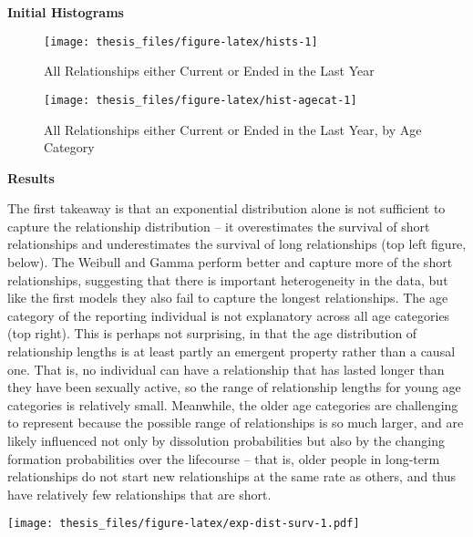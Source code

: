 \documentclass [11pt, proquest] {uwthesis}[2015/03/03]
\begin{document}
\textbf{Initial Histograms}
\begin{figure}

{\centering \texttt{[image: thesis\_files/figure-latex/hists-1]} 

}

\caption{All Relationships either Current or Ended in the Last Year}\label{fig:hists}
\end{figure}
\begin{figure}

{\centering \texttt{[image: thesis\_files/figure-latex/hist-agecat-1]} 

}

\caption{All Relationships either Current or Ended in the Last Year, by Age Category}\label{fig:hist-agecat}
\end{figure}
\textbf{Results}

The first takeaway is that an exponential distribution alone is not
sufficient to capture the relationship distribution -- it overestimates
the survival of short relationships and underestimates the survival of
long relationships (top left figure, below). The Weibull and Gamma
perform better and capture more of the short relationships, suggesting
that there is important heterogeneity in the data, but like the first
models they also fail to capture the longest relationships. The age
category of the reporting individual is not explanatory across all age
categories (top right). This is perhaps not surprising, in that the age
distribution of relationship lengths is at least partly an emergent
property rather than a causal one. That is, no individual can have a
relationship that has lasted longer than they have been sexually active,
so the range of relationship lengths for young age categories is
relatively small. Meanwhile, the older age categories are challenging to
represent because the possible range of relationships is so much larger,
and are likely influenced not only by dissolution probabilities but also
by the changing formation probabilities over the lifecourse -- that is,
older people in long-term relationships do not start new relationships
at the same rate as others, and thus have relatively few relationships
that are short.

\texttt{[image: thesis\_files/figure-latex/exp-dist-surv-1.pdf]}
\end{document}
